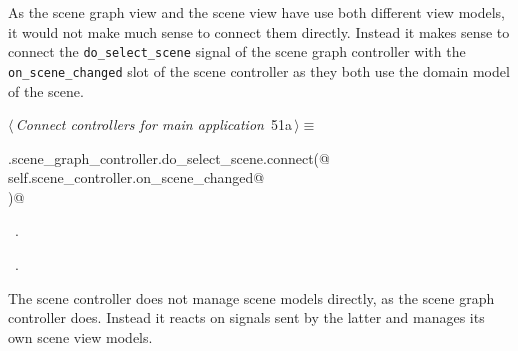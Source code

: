 \documentclass[
    a4paper,      %
    10pt,         %
    openright,    %
    notitlepage,  %
    parskip=half, %
]{scrreprt}       %
\theoremstyle{definition}                    %
\begin{document}
As the scene graph view and the scene view have use both different view models,
it would not make much sense to connect them directly. Instead it makes sense to
connect the \verb+do_select_scene+ signal of the scene graph controller with the
\verb+on_scene_changed+ slot of the scene controller as they both use the
domain model of the scene.

\begin{flushleft} \small
\begin{minipage}{\linewidth}\label{scrap76}\raggedright\small
{} $\langle\,${\itshape Connect controllers for main application}\nobreak\ {\footnotesize {51a}}$\,\rangle\equiv$
\vspace{-1exm}
\begin{list}{}{} \item
\mbox{}\lstinline@self.scene_graph_controller.do_select_scene.connect(@\\
\mbox{}\lstinline@    self.scene_controller.on_scene_changed@\\
\mbox{}\lstinline@)@{\NWsep}
\end{list}
\vspace{-1.5ex}
\footnotesize
\begin{list}{}{\setlength{\itemsep}{-\parsep}\setlength{\itemindent}{-\leftmargin}}
\item \NWtxtMacroDefBy\ .
\item \NWtxtMacroRefIn\ .

\item{}
\end{list}
\end{minipage}\vspace{4ex}
\end{flushleft}
The scene controller does not manage scene models directly, as the scene graph
controller does. Instead it reacts on signals sent by the latter and manages
its own scene view models.
\end{document}
